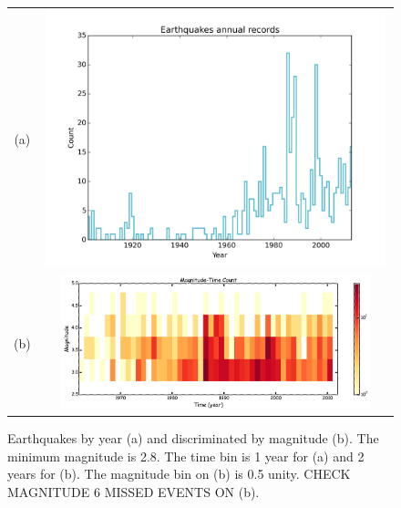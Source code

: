 \documentclass[draft, grl]{agutex}
\begin{document}
\begin{figure}
	\begin{center}
	\begin{table}[H]
		\begin{tabular}{ c c }
		\footnotesize(a)
		& \includegraphics[width=0.99\textwidth]{z_img_hmtk_bsb2014_11_rate}
		\\
		\footnotesize(b)
		& \includegraphics[width=0.90\textwidth]{z_img_time_mag_count_br_1960}
		\end{tabular}
	\end{table}
	\caption{Earthquakes by year (a) and discriminated by magnitude (b). The minimum magnitude is 2.8. The time bin is 1 year for (a) and 2 years for (b). The magnitude bin on (b) is 0.5 unity. CHECK MAGNITUDE 6 MISSED EVENTS ON (b). }
	\label{fig_records}
	\end{center}
\end{figure}
\end{document}
